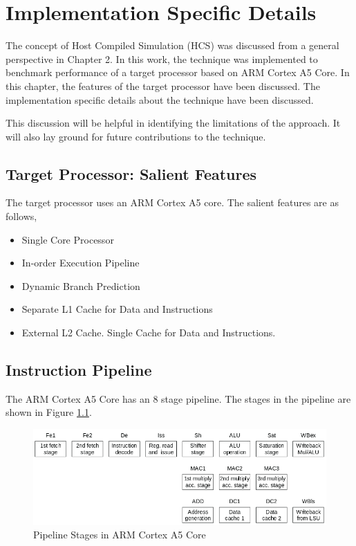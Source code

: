 \chapter{Implementation Specific Details}

The concept of Host Compiled Simulation (HCS) was discussed from a general perspective in Chapter 2. In this work, the technique was implemented to benchmark performance of a target processor based on ARM Cortex A5 Core. In this chapter, the features of the target processor have been discussed. The implementation specific details about the technique have been discussed. 

This discussion will be helpful in identifying the limitations of the approach. It will also lay ground for future contributions to the technique.

\section{Target Processor: Salient Features}

The target processor uses an ARM Cortex A5 core. The salient features are as follows,

\begin{itemize} \itemsep -4pt
\item Single Core Processor
\item In-order Execution Pipeline
\item Dynamic Branch Prediction
\item Separate L1 Cache for Data and Instructions
\item External L2 Cache. Single Cache for Data and Instructions.
\end{itemize}

\section{Instruction Pipeline}
The ARM Cortex A5 Core has an 8 stage pipeline. The stages in the pipeline are shown in Figure \ref{fig:pipelineA5}.

\begin{figure}[h]
\includegraphics[width=\textwidth]{figures/pipeline.png}
\caption{Pipeline Stages in ARM Cortex A5 Core \cite{CortexA5TRM}}
\label{fig:pipelineA5}
\end{figure}

